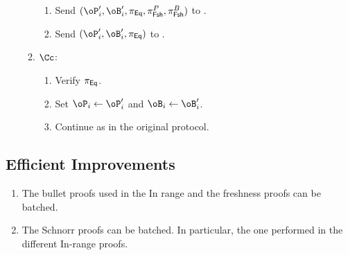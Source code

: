 \begin{enumerate}
\begin{enumerate}
\begin{enumerate}
			\item Send $(\oP_i',\oB_i',\pi_\Eqs,\pi^P_\FshS,\pi^B_\FshS)$ to \Cc.
			\item Send $(\oP_i',\oB_i',\pi_\Eqs)$ to \Cc.
		
		
		\end{enumerate}
		
		\item $\Cc$:
			\begin{enumerate}
				
					\item Verify $\pi_{\sf Eq}$.
				
				\item Set $\oP_i  \asn \oP_i'$  and $\oB_i  \asn \oB_i'$.
				
				\item Continue as in the original protocol.
			\end{enumerate}
		
	\end{enumerate}
\end{enumerate}


\subsection{Efficient Improvements}\label{sec:ChanksEg:EfficientImp}

\begin{enumerate}
	\item The bullet proofs used  in the In range and the freshness proofs can be batched. 
	
	\item The Schnorr proofs can be batched. In particular, the one performed in the different In-range proofs.  
\end{enumerate}